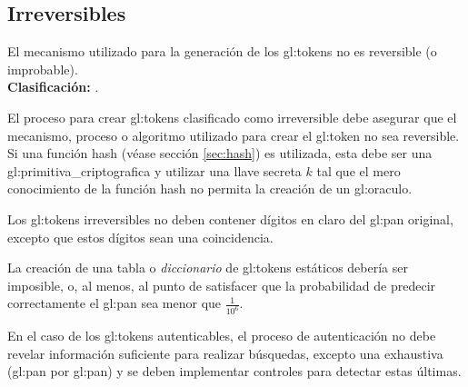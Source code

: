 %
%

\subsection{Irreversibles}

{
  El mecanismo utilizado para la generación de los \glspl{gl:token}
  no es reversible (o improbable). \\
  \nopagebreak[4]
  \textbf{Clasificación:} .

  {
    El proceso para crear \glspl{gl:token} clasificado como irreversible
    debe asegurar que el mecanismo, proceso o algoritmo utilizado para
    crear el \gls{gl:token} no sea reversible. Si una función hash (véase
    sección \ref{sec:hash}) es utilizada, esta debe ser una
    \gls{gl:primitiva_criptografica} y utilizar una llave secreta $k$ tal que
    el mero conocimiento de la función hash no permita la creación de un
    \gls{gl:oraculo}.
  }

  {
    Los \glspl{gl:token} irreversibles no deben contener dígitos en claro del
    \gls{gl:pan} original, excepto que estos dígitos sean una coincidencia.
  }

  {
    La creación de una tabla o \textit{diccionario} de \glspl{gl:token}
    estáticos debería ser imposible, o, al menos, al punto de satisfacer que
    la probabilidad de predecir correctamente el \gls{gl:pan} sea menor que
    $\frac{1}{10^6}$.
  }

  {
    En el caso de los \glspl{gl:token} autenticables, el proceso de
    autenticación no debe revelar información suficiente para realizar
    búsquedas, excepto una exhaustiva (\gls{gl:pan} por \gls{gl:pan}) y se
    deben implementar controles para detectar estas últimas.
  }
}

